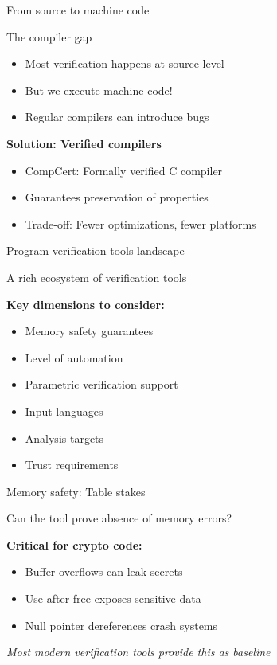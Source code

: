 \documentclass[aspectratio=169, lualatex, handout]{beamer}
\begin{document}
\begin{frame}{From source to machine code}
	\begin{center}
		\Large
		The compiler gap
	\end{center}
	\vspace{1em}
	\begin{itemize}
		\item Most verification happens at source level
		\item But we execute machine code!
		\item Regular compilers can introduce bugs
	\end{itemize}
	\vspace{0.5em}
	\textbf{Solution: Verified compilers}
	\begin{itemize}
		\item CompCert: Formally verified C compiler
		\item Guarantees preservation of properties
		\item Trade-off: Fewer optimizations, fewer platforms
	\end{itemize}
\end{frame}

\begin{frame}{Program verification tools landscape}
	\begin{center}
		\Large
		A rich ecosystem of verification tools
	\end{center}
	\vspace{1em}
	\textbf{Key dimensions to consider:}
	\begin{itemize}
		\item Memory safety guarantees
		\item Level of automation
		\item Parametric verification support
		\item Input languages
		\item Analysis targets
		\item Trust requirements
	\end{itemize}
\end{frame}

\begin{frame}{Memory safety: Table stakes}
	\begin{center}
		\Large
		Can the tool prove absence of memory errors?
	\end{center}
	\vspace{1em}
	\textbf{Critical for crypto code:}
	\begin{itemize}
		\item Buffer overflows can leak secrets
		\item Use-after-free exposes sensitive data
		\item Null pointer dereferences crash systems
	\end{itemize}
	\vspace{0.5em}
	\begin{center}
		\textit{Most modern verification tools provide this as baseline}
	\end{center}
\end{frame}
\end{document}
